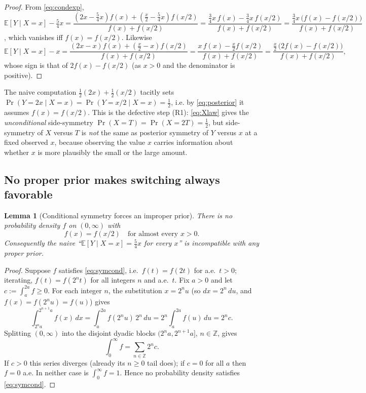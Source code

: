 \documentclass{amsart}
\theoremstyle{plain}
\newtheorem{lemma}{Lemma}
\theoremstyle{definition}
\begin{document}
\begin{proof}
From \eqref{eq:condexp},
$\mathbb E[Y\mid X=x]-\tfrac54 x
=\dfrac{(2x-\tfrac54x)f(x)+(\tfrac x2-\tfrac54x)f(x/2)}{f(x)+f(x/2)}
=\dfrac{\tfrac34 x\,f(x)-\tfrac34 x\,f(x/2)}{f(x)+f(x/2)}
=\dfrac{\tfrac34 x\,\bigl(f(x)-f(x/2)\bigr)}{f(x)+f(x/2)}$,
which vanishes iff $f(x)=f(x/2)$. Likewise
\[
\mathbb E[Y\mid X=x]-x
=\frac{(2x-x)f(x)+(\tfrac x2-x)f(x/2)}{f(x)+f(x/2)}
=\frac{x\,f(x)-\tfrac x2 f(x/2)}{f(x)+f(x/2)}
=\frac{\tfrac x2\,\bigl(2f(x)-f(x/2)\bigr)}{f(x)+f(x/2)} ,
\]
whose sign is that of $2f(x)-f(x/2)$ (as $x>0$ and the denominator is positive).
\end{proof}

The naive computation $\tfrac12(2x)+\tfrac12(x/2)$ tacitly sets
$\Pr(Y=2x\mid X=x)=\Pr(Y=x/2\mid X=x)=\tfrac12$, i.e. by \eqref{eq:posterior}
it assumes $f(x)=f(x/2)$. This is the defective step (R1): \eqref{eq:Xlaw} gives
the \emph{unconditional} side-symmetry $\Pr(X=T)=\Pr(X=2T)=\tfrac12$, but
side-symmetry of $X$ versus $T$ is \emph{not} the same as posterior symmetry of
$Y$ versus $x$ at a fixed observed $x$, because observing the value $x$ carries
information about whether $x$ is more plausibly the small or the large amount.

\subsection{No proper prior makes switching always favorable}

\begin{lemma}[Conditional symmetry forces an improper prior]\label{lem:noproper}
There is no probability density $f$ on $(0,\infty)$ with
\begin{equation}\label{eq:symcond}
f(x)=f(x/2)\quad\text{for almost every }x>0 .
\end{equation}
Consequently the naive ``$\mathbb E[Y\mid X=x]=\tfrac54x$ for every $x$'' is
incompatible with any proper prior.
\end{lemma}

\begin{proof}
Suppose $f$ satisfies \eqref{eq:symcond}, i.e.\ $f(t)=f(2t)$ for a.e.\ $t>0$;
iterating, $f(t)=f(2^{n}t)$ for all integers $n$ and a.e.\ $t$. Fix $a>0$ and let
$c:=\int_a^{2a} f\ge 0$. For each integer $n$, the substitution $x=2^{n}u$
(so $dx=2^{n}\,du$, and $f(x)=f(2^{n}u)=f(u)$) gives
\[
\int_{2^{n} a}^{2^{n+1}a} f(x)\,dx
=\int_{a}^{2a} f(2^{n}u)\,2^{n}\,du
=2^{n}\int_{a}^{2a} f(u)\,du
=2^{n}c .
\]
Splitting $(0,\infty)$ into the disjoint dyadic blocks $(2^{n}a,2^{n+1}a]$,
$n\in\mathbb Z$, gives
\[
\int_0^\infty f=\sum_{n\in\mathbb Z} 2^{n}c .
\]
If $c>0$ this series diverges (already its $n\ge 0$ tail does); if $c=0$ for all
$a$ then $f=0$ a.e. In neither case is $\int_0^\infty f=1$. Hence no probability
density satisfies \eqref{eq:symcond}.
\end{proof}
\end{document}
